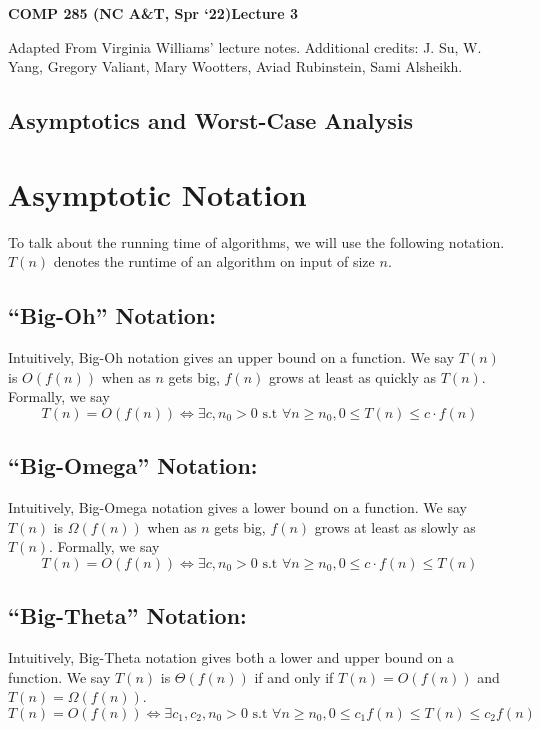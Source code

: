 \documentclass [12pt]{article}
\begin{document}
 

{\LARGE \textbf {COMP 285 (NC A\&T, Spr `22)}\hfill \textbf {Lecture 3} } 
\vspace {1em} 
\begin {Instruction} 

Adapted From Virginia Williams' lecture notes. Additional credits: J. Su, W. Yang, Gregory Valiant, Mary Wootters, Aviad Rubinstein, Sami Alsheikh.
\end {Instruction} 

\begin{centering}
\section*{Asymptotics and Worst-Case Analysis}
\end{centering}


\section{Asymptotic Notation}
To talk about the running time of algorithms, we will use the following notation. $T(n)$ denotes
the runtime of an algorithm on input of size $n$.

\subsection{``Big-Oh'' Notation:}

Intuitively, Big-Oh notation gives an upper bound on a function. We say $T(n)$ is $O(f(n))$ when as $n$ gets big, $f (n)$ grows at least as quickly as $T(n)$. Formally, we say
$$
 T(n) = O(f(n)) \iff \exists c, n_0 > 0 \text{ s.t } \forall n \geq n_0, 0 \leq T(n) \leq c \cdot f(n)
$$

\subsection{``Big-Omega'' Notation:}

Intuitively, Big-Omega notation gives a lower bound on a function. We say $T(n)$ is $\Omega(f(n))$ when as $n$ gets big, $f (n)$ grows at least as slowly as $T(n)$. Formally, we say
$$
 T(n) = O(f(n)) \iff \exists c, n_0 > 0 \text{ s.t } \forall n \geq n_0, 0 \leq c \cdot f(n) \leq T(n)
$$

\subsection{``Big-Theta'' Notation:}

Intuitively, Big-Theta notation gives both a lower and upper bound on a function. We say $T(n)$ is $\Theta(f(n))$ if and only if $T(n) = O(f(n))$ and $T(n) = \Omega(f(n))$.
$$
 T(n) = O(f(n)) \iff \exists c_1, c_2, n_0 > 0 \text{ s.t } \forall n \geq n_0, 0 \leq c_1 f(n) \leq T(n) \leq c_2 f(n)
$$
\end{document}
